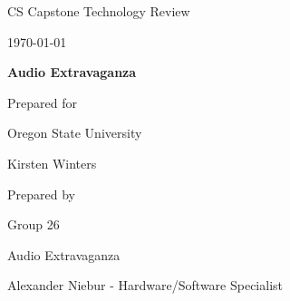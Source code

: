 \documentclass[onecolumn, draftclsnofoot,10pt, compsoc]{IEEEtran}
\def \CapstoneTeamName{Audio Extravaganza}
\def \CapstoneTeamNumber{26}
\def \GroupMemberOne{Martin Barker}
\def \GroupMemberTwo{Devon Cash}
\def \GroupMemberThree{Alexander Niebur - Hardware/Software Specialist}
\def \GroupMemberFour{Mason Sidebottom}
\def \GroupMemberFive{Ben Windheim}
\def \CapstoneProjectName{Audio Extravaganza}
\def \CapstoneSponsorCompany{Oregon State University}
\def \CapstoneSponsorPerson{Kirsten Winters}
\def \DocType{%
  Technology Review
  }
\newcommand{\NameSigPair}[1]{\par
  \makebox[2.75in][r]{#1} \hfil \makebox[3.25in]{\makebox[2.25in]{\hrulefill} \hfill\makebox[.75in]{\hrulefill}}
\par\vspace{-12pt} \textit{\tiny\noindent
  \makebox[2.75in]{} \hfil\makebox[3.25in]{\makebox[2.25in][r]{Signature} \hfill\makebox[.75in][r]{Date}}}}
\renewcommand{\NameSigPair}[1]{#1}
\begin{document}
\begin{titlepage}
    \begin{singlespace}
        \hfill 
        \par\vspace{.2in}
        \centering
        \scshape{
            \huge CS Capstone \DocType \par
            {\large\today}\par
            \vspace{.5in}
            \textbf{\Huge\CapstoneProjectName}\par
            \vfill
            {\large Prepared for}\par
            \Huge \CapstoneSponsorCompany\par
            \vspace{5pt}
            {\Large\NameSigPair{\CapstoneSponsorPerson}\par}
            {\large Prepared by }\par
            Group \CapstoneTeamNumber\par
            \CapstoneTeamName\par 
            \vspace{5pt}
            {\Large
                \NameSigPair{\GroupMemberThree}\par
            }
            \vspace{20pt}
        }
    \end{singlespace}
\end{titlepage}
\end{document}
